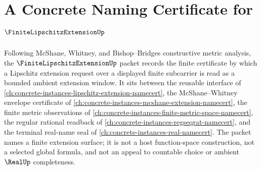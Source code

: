 \chapter{A Concrete Naming Certificate for $\FiniteLipschitzExtensionUp$}
\label{ch:concrete-instances-finite-lipschitz-extension-namecert}

Following McShane, Whitney, and Bishop--Bridges constructive metric analysis, the $\FiniteLipschitzExtensionUp$ packet records the finite certificate by which a Lipschitz extension request over a displayed finite subcarrier is read as a bounded ambient extension window. It sits between the reusable interface of \autoref{ch:concrete-instances-lipschitz-extension-namecert}, the McShane--Whitney envelope certificate of \autoref{ch:concrete-instances-mcshane-extension-namecert}, the finite metric observations of \autoref{ch:concrete-instances-finite-metric-space-namecert}, the regular rational readback of \autoref{ch:concrete-instances-regseqrat-namecert}, and the terminal real-name seal of \autoref{ch:concrete-instances-real-namecert}. The packet names a finite extension surface; it is not a host function-space construction, not a selected global formula, and not an appeal to countable choice or ambient $\RealUp$ completeness.


